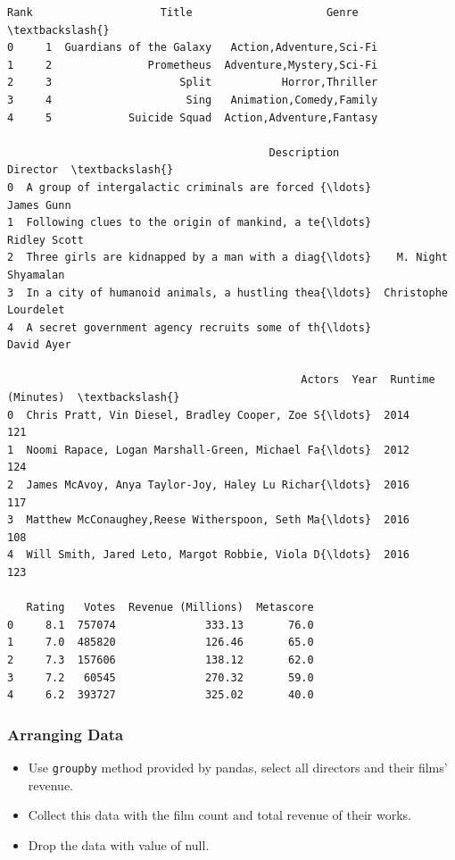 \documentclass[11pt]{article}
\providecommand{\tightlist}{%
      \setlength{\itemsep}{0pt}\setlength{\parskip}{0pt}}
\begin{document}
    \begin{Verbatim}[commandchars=\\\{\}]
   Rank                    Title                     Genre  \textbackslash{}
0     1  Guardians of the Galaxy   Action,Adventure,Sci-Fi   
1     2               Prometheus  Adventure,Mystery,Sci-Fi   
2     3                    Split           Horror,Thriller   
3     4                     Sing   Animation,Comedy,Family   
4     5            Suicide Squad  Action,Adventure,Fantasy   

                                         Description              Director  \textbackslash{}
0  A group of intergalactic criminals are forced {\ldots}            James Gunn   
1  Following clues to the origin of mankind, a te{\ldots}          Ridley Scott   
2  Three girls are kidnapped by a man with a diag{\ldots}    M. Night Shyamalan   
3  In a city of humanoid animals, a hustling thea{\ldots}  Christophe Lourdelet   
4  A secret government agency recruits some of th{\ldots}            David Ayer   

                                              Actors  Year  Runtime (Minutes)  \textbackslash{}
0  Chris Pratt, Vin Diesel, Bradley Cooper, Zoe S{\ldots}  2014                121   
1  Noomi Rapace, Logan Marshall-Green, Michael Fa{\ldots}  2012                124   
2  James McAvoy, Anya Taylor-Joy, Haley Lu Richar{\ldots}  2016                117   
3  Matthew McConaughey,Reese Witherspoon, Seth Ma{\ldots}  2016                108   
4  Will Smith, Jared Leto, Margot Robbie, Viola D{\ldots}  2016                123   

   Rating   Votes  Revenue (Millions)  Metascore  
0     8.1  757074              333.13       76.0  
1     7.0  485820              126.46       65.0  
2     7.3  157606              138.12       62.0  
3     7.2   60545              270.32       59.0  
4     6.2  393727              325.02       40.0  

    \end{Verbatim}

    \subsubsection{Arranging Data}\label{arranging-data}

\begin{itemize}
\tightlist
\item
  Use \texttt{groupby} method provided by pandas, select all directors
  and their films' revenue.
\item
  Collect this data with the film count and total revenue of their
  works.
\item
  Drop the data with value of null.
\end{itemize}
\end{document}
